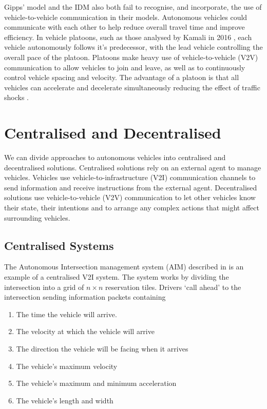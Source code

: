 Gipps' model and the IDM also both fail to recognise, and incorporate, the use of vehicle-to-vehicle communication in their models. Autonomous vehicles could communicate with each other to help reduce overall travel time and improve efficiency. In vehicle platoons, such as those analysed by Kamali in 2016 \citep{Kamali2016}, each vehicle autonomously follows it's predecessor, with the lead vehicle controlling the overall pace of the platoon. Platoons make heavy use of vehicle-to-vehicle (V2V) communication to allow vehicles to join and leave, as well as to continuously control vehicle spacing and velocity. The advantage of a platoon is that all vehicles can accelerate and decelerate simultaneously reducing the effect of traffic shocks \citep{Daganzo1994}.

\section{Centralised and Decentralised}
\label{sec:Centralised and Decentralised}
We can divide approaches to autonomous vehicles into centralised and decentralised solutions. Centralised solutions rely on an external agent to manage vehicles. Vehicles use vehicle-to-infrastructure (V2I) communication channels to send information and receive instructions from the external agent. Decentralised solutions use vehicle-to-vehicle (V2V) communication to let other vehicles know their state, their intentions and to arrange any complex actions that might affect surrounding vehicles.

\subsection{Centralised Systems}
\label{subsec:Centralised Systems}
The Autonomous Intersection management system (AIM) described in \citep{Dresner2004} is an example of a centralised V2I system. The system works by dividing the intersection into a grid of $n \times n$ reservation tiles. Drivers `call ahead' to the intersection sending information packets containing

\begin{enumerate}
\item The time the vehicle will arrive.
\item The velocity at which the vehicle will arrive
\item The direction the vehicle will be facing when it arrives
\item The vehicle's maximum velocity
\item The vehicle's maximum and minimum acceleration
\item The vehicle's length and width
\end{enumerate}

